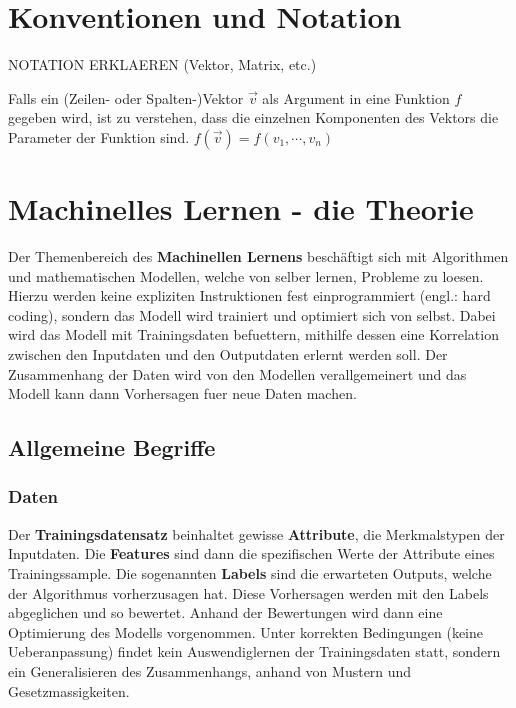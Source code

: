 \documentclass[../main]{subfiles}
\begin{document}
\section{Konventionen und Notation}

NOTATION ERKLAEREN (Vektor, Matrix, etc.)
\par\bigskip
Falls ein (Zeilen- oder Spalten-)Vektor $\vec{v}$ als Argument in eine Funktion $f$ gegeben wird, ist zu verstehen,
dass die einzelnen Komponenten des Vektors die Parameter der Funktion sind.
$f(\vec{v})=f(v_1,\cdots,v_n)$

\section{Machinelles Lernen - die Theorie}

Der Themenbereich des \textbf{Machinellen Lernens} beschäftigt sich mit Algorithmen und mathematischen Modellen, welche von selber lernen, Probleme zu loesen.
Hierzu werden keine expliziten Instruktionen fest einprogrammiert (engl.: hard coding), sondern das Modell wird trainiert und optimiert sich von selbst.
Dabei wird das Modell mit Trainingsdaten befuettern, mithilfe dessen eine Korrelation zwischen den Inputdaten und den Outputdaten erlernt werden soll.
Der Zusammenhang der Daten wird von den Modellen verallgemeinert und das Modell kann dann Vorhersagen fuer neue Daten machen. 

\subsection{Allgemeine Begriffe}

\subsubsection{Daten}

Der \textbf{Trainingsdatensatz} beinhaltet gewisse \textbf{Attribute}, die Merkmalstypen der Inputdaten.
Die \textbf{Features} sind dann die spezifischen Werte der Attribute eines Trainingssample.
Die sogenannten \textbf{Labels} sind die erwarteten Outputs, welche der Algorithmus vorherzusagen hat.
Diese Vorhersagen werden mit den Labels abgeglichen und so bewertet.
Anhand der Bewertungen wird dann eine Optimierung des Modells vorgenommen.
Unter korrekten Bedingungen (keine Ueberanpassung) findet kein Auswendiglernen der Trainingsdaten statt,
sondern ein Generalisieren des Zusammenhangs, anhand von Mustern und Gesetzmassigkeiten.
\end{document}
